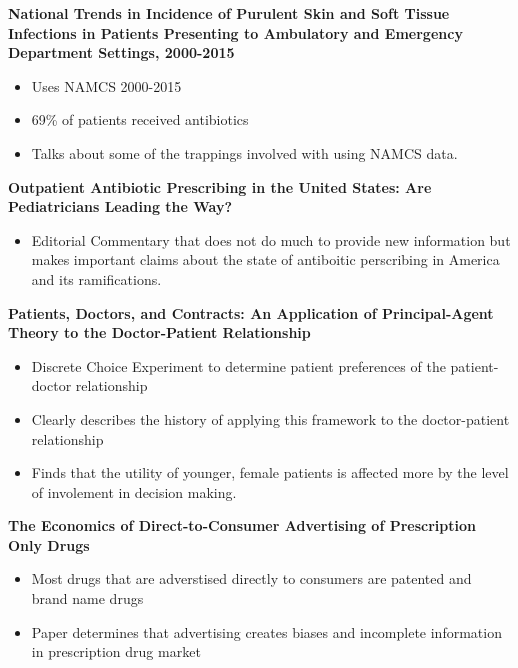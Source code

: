 \noindent\textbf{National Trends in Incidence of Purulent Skin and Soft Tissue Infections in Patients Presenting to Ambulatory and Emergency Department Settings, 2000-2015} \cite{fritz_national_2020}\\
\begin{itemize}
    \item Uses NAMCS 2000-2015
    \item 69\% of patients received antibiotics
    \item Talks about some of the trappings involved with using NAMCS data.
\end{itemize}

\noindent\textbf{Outpatient Antibiotic Prescribing in the United States: Are Pediatricians Leading the Way?} \cite{gerber_outpatient_2019}\\
\begin{itemize}
    \item Editorial Commentary that does not do much to provide new information but makes important claims about the state of antiboitic perscribing in America and its ramifications.
\end{itemize}

\noindent\textbf{Patients, Doctors, and Contracts: An Application of Principal-Agent Theory to the Doctor-Patient Relationship} \cite{scott_patients_1999}\\
\begin{itemize}
    \item Discrete Choice Experiment to determine patient preferences of the patient-doctor relationship
    \item Clearly describes the history of applying this framework to the doctor-patient relationship
    \item Finds that the utility of younger, female patients is affected more by the level of involement in decision making.
\end{itemize}

\noindent\textbf{The Economics of Direct-to-Consumer Advertising of Prescription Only Drugs} \cite{morgan_economics_2003}\\
\begin{itemize}
    \item Most drugs that are adverstised directly to consumers are patented and brand name drugs
    \item Paper determines that advertising creates biases and incomplete information in prescription drug market
\end{itemize}

